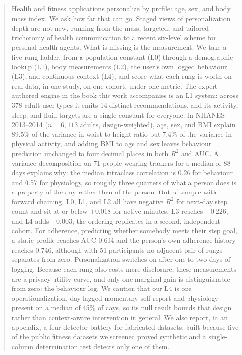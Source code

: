 \documentclass[conference]{IEEEtran}
\begin{document}
\begin{abstract}
Health and fitness applications personalize by profile: age, sex, and body mass index. We ask how far that can go. Staged views of personalization depth are not new, running from the mass, targeted, and tailored trichotomy of health communication to a recent six-level scheme for personal health agents. What is missing is the measurement. We take a five-rung ladder, from a population constant (L0) through a demographic lookup (L1), body measurements (L2), the user's own logged behaviour (L3), and continuous context (L4), and score what each rung is worth on real data, in one study, on one cohort, under one metric. The expert-authored engine in the book this work accompanies is an L1 system: across 378 adult user types it emits 14 distinct recommendations, and its activity, sleep, and fluid targets are a single constant for everyone. In NHANES 2013--2014 ($n = 6{,}113$ adults, design-weighted), age, sex, and BMI explain 89.5\% of the variance in waist-to-height ratio but 7.4\% of the variance in physical activity, and adding BMI to age and sex leaves behaviour prediction unchanged to four decimal places in both $R^2$ and AUC. A variance decomposition on 71 people wearing trackers for a median of 88 days explains why: the median intraclass correlation is 0.26 for behaviour and 0.57 for physiology, so roughly three quarters of what a person does is a property of the day rather than of the person. Out of sample with forward chaining, L0, L1, and L2 all have negative $R^2$ for next-day step count and sit at or below $+0.018$ for active minutes, L3 reaches $+0.226$, and L4 adds $+0.003$; the ordering replicates in a second, independent cohort. For adherence, predicting whether somebody meets their step goal, a static profile reaches AUC 0.604 and the person's own adherence history reaches 0.746, although with 51 participants no adjacent pair of rungs separates from zero. Personalization switches on after one to two days of logging. Because each rung also costs more disclosure, these measurements are a privacy-utility curve, and only one marginal gain is distinguishable from zero: the behaviour log. We caution that our L4 is one operationalization, day-lagged momentary self-report and physiology present on a median of 45\% of days, so its null result bounds that design rather than context-aware intervention in general. We also report, in an appendix, a four-detector battery for fabricated datasets, built because five of the public fitness datasets we screened proved synthetic and a single-column determination test detects only one of them.
\end{abstract}
\end{document}
